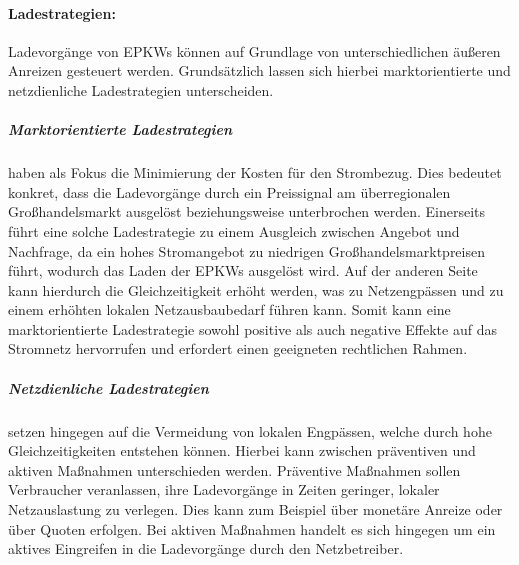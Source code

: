 


\paragraph{Ladestrategien:}

Ladevorgänge von \glspl{EPKW} können auf Grundlage von unterschiedlichen äußeren Anreizen gesteuert werden.
Grundsätzlich lassen sich hierbei marktorientierte und netzdienliche Ladestrategien unterscheiden.


\subparagraph{Marktorientierte Ladestrategien} haben als Fokus die Minimierung der Kosten für den Strombezug. Dies bedeutet konkret, dass die Ladevorgänge durch ein Preissignal am überregionalen Großhandelsmarkt ausgelöst beziehungsweise unterbrochen werden.
Einerseits führt eine solche Ladestrategie zu einem Ausgleich zwischen Angebot und Nachfrage, da ein hohes Stromangebot zu niedrigen Großhandelsmarktpreisen führt, wodurch das Laden der \glspl{EPKW} ausgelöst wird.
Auf der anderen Seite kann hierdurch die Gleichzeitigkeit erhöht werden, was zu Netzengpässen und zu einem erhöhten lokalen Netzausbaubedarf führen kann.
Somit kann eine marktorientierte Ladestrategie sowohl positive als auch negative Effekte auf das Stromnetz hervorrufen und erfordert einen geeigneten rechtlichen Rahmen. \cite{Agora2019} \cite{Dorendorf2019} \cite{Rehtanz2017}


\subparagraph{Netzdienliche Ladestrategien} setzen hingegen auf die Vermeidung von lokalen Engpässen, welche durch hohe Gleichzeitigkeiten entstehen können.
Hierbei kann zwischen präventiven und aktiven Maßnahmen unterschieden werden.
Präventive Maßnahmen sollen Verbraucher veranlassen, ihre Ladevorgänge in Zeiten geringer, lokaler Netzauslastung zu verlegen.
Dies kann zum Beispiel über monetäre Anreize oder über Quoten erfolgen.
Bei aktiven Maßnahmen handelt es sich hingegen um ein aktives Eingreifen in die Ladevorgänge durch den Netzbetreiber. \cite{Agora2019}


\clearpage
